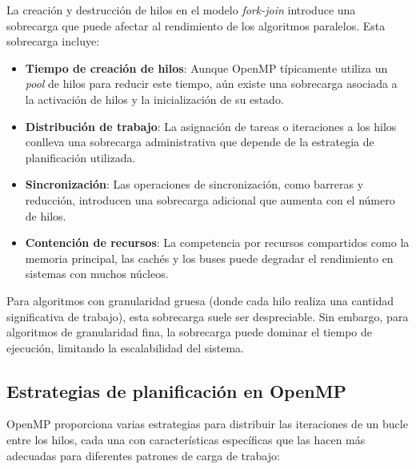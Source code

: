             La creación y destrucción de hilos en el modelo \textit{fork-join} introduce una sobrecarga que puede afectar al rendimiento de los algoritmos paralelos. Esta sobrecarga incluye:
            
            \begin{itemize}
            
                \item \textbf{Tiempo de creación de hilos}: Aunque OpenMP típicamente utiliza un \textit{pool} de hilos para reducir este tiempo, aún existe una sobrecarga asociada a la activación de hilos y la inicialización de su estado.
                
                \item \textbf{Distribución de trabajo}: La asignación de tareas o iteraciones a los hilos conlleva una sobrecarga administrativa que depende de la estrategia de planificación utilizada.
                
                \item \textbf{Sincronización}: Las operaciones de sincronización, como barreras y reducción, introducen una sobrecarga adicional que aumenta con el número de hilos.
                
                \item \textbf{Contención de recursos}: La competencia por recursos compartidos como la memoria principal, las cachés y los buses puede degradar el rendimiento en sistemas con muchos núcleos.

                \end{itemize}
            
            Para algoritmos con granularidad gruesa (donde cada hilo realiza una cantidad significativa de trabajo), esta sobrecarga suele ser despreciable. Sin embargo, para algoritmos de granularidad fina, la sobrecarga puede dominar el tiempo de ejecución, limitando la escalabilidad del sistema.

        \subsection{Estrategias de planificación en OpenMP}
        
            OpenMP proporciona varias estrategias para distribuir las iteraciones de un bucle entre los hilos, cada una con características específicas que las hacen más adecuadas para diferentes patrones de carga de trabajo:

